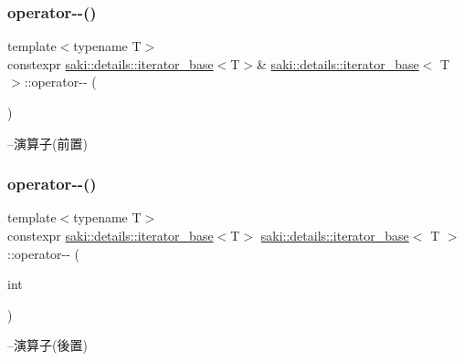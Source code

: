 \subsubsection{\texorpdfstring{operator-\/-\/()}{operator--()}\hspace{0.1cm}{\footnotesize\ttfamily [1/2]}}
{\footnotesize\ttfamily template$<$typename T$>$ \\
constexpr \mbox{\hyperlink{classsaki_1_1details_1_1iterator__base}{saki\+::details\+::iterator\+\_\+base}}$<$T$>$\& \mbox{\hyperlink{classsaki_1_1details_1_1iterator__base}{saki\+::details\+::iterator\+\_\+base}}$<$ T $>$\+::operator-\/-\/ (\begin{DoxyParamCaption}{ }\end{DoxyParamCaption})\hspace{0.3cm}{\ttfamily [inline]}}



--演算子(前置) 

\mbox{\label{classsaki_1_1details_1_1iterator__base_a916d333d66267d52916eb442b092ed68}} 
\subsubsection{\texorpdfstring{operator-\/-\/()}{operator--()}\hspace{0.1cm}{\footnotesize\ttfamily [2/2]}}
{\footnotesize\ttfamily template$<$typename T$>$ \\
constexpr \mbox{\hyperlink{classsaki_1_1details_1_1iterator__base}{saki\+::details\+::iterator\+\_\+base}}$<$T$>$ \mbox{\hyperlink{classsaki_1_1details_1_1iterator__base}{saki\+::details\+::iterator\+\_\+base}}$<$ T $>$\+::operator-\/-\/ (\begin{DoxyParamCaption}\item[{int}]{ }\end{DoxyParamCaption})\hspace{0.3cm}{\ttfamily [inline]}}



--演算子(後置) 

\mbox{\label{classsaki_1_1details_1_1iterator__base_a34d98882fa35d0c48ffe5a29c1a1f4cf}} 
